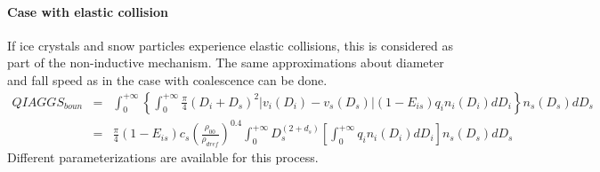 \paragraph{Case with elastic collision}

If ice crystals and snow particles experience elastic collisions, this is considered as part of the non-inductive mechanism.
The same approximations about diameter and fall speed as in the case with coalescence can be done.
\begin{eqnarray}
  QIAGGS_{boun} &=& \int_0 ^{+ \infty} \left\{\int_0 ^{+ \infty} \frac{\pi}{4} (D_i + D_s)^2 |v_i (D_i) - v_s (D_s)| (1 - E_{is}) q_i n_i (D_i) dD_i \right\} n_s (D_s) dD_s \nonumber \\
                &=& \frac{\pi}{4} (1 - E_{is}) c_s \left( \frac{\rho _{00}}{\rho _{dref}} \right) ^{0.4}
			\int_0 ^{+ \infty} D_s ^{(2 + d_s)} \left[ \int_0 ^{+ \infty} q_i n_i (D_i) dD_i \right] n_s (D_s) dD_s
\end{eqnarray}
Different parameterizations are available for this process.\\

